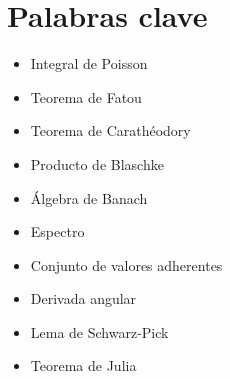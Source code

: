 %
%
%
%
%

\chapter{Palabras clave}

\begin{itemize}
    \item Integral de Poisson
    \item Teorema de Fatou
    \item Teorema de Carathéodory
    \item Producto de Blaschke
    \item Álgebra de Banach
    \item Espectro
    \item Conjunto de valores adherentes
    \item Derivada angular
    \item Lema de Schwarz-Pick
    \item Teorema de Julia
\end{itemize}

\endinput
